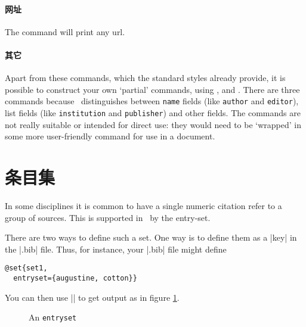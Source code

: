 \paragraph{网址} The  command will print any url.

\paragraph{其它} Apart from these commands, which the standard
styles already provide, it is possible to construct your own `partial'
commands, using ,  and
. There are three commands because \biblatex\
distinguishes between \verb|name| fields (like \texttt{author} and
\texttt{editor}), list fields (like \texttt{institution} and
\texttt{publisher}) and other fields. The commands are not really
suitable or intended for direct use: they would need to be `wrapped'
in some more user-friendly command for use in a document.

\section{条目集}

In some disciplines it is common to have a single numeric citation
refer to a group of sources. This is supported in \biblatex\ by the
entry-set.\manref{\S~3.12.5}

There are two ways to define such a set. One way is to define them as
a |key| in the |.bib| file. Thus, for instance, your |.bib| file might
define
\begin{Verbatim}
@set{set1,
  entryset={augustine, cotton}}
\end{Verbatim}
You can then use |\cite{set1}| to get output as in figure \ref{entryset1}.
\begin{figure}
\caption{An \texttt{entryset}\label{entryset1}}
\end{figure}

